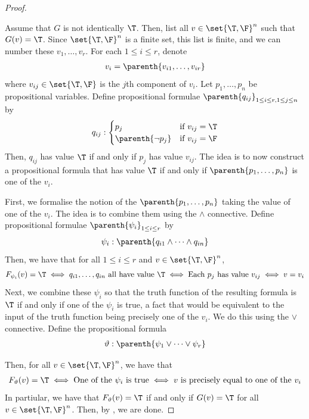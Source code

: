 \begin{proof}
\begin{description}
        Assume that $G$ is not identically $\T$. Then, list all $v \in \set{\T, \F}^n$ such that $G(v) = \T$. Since $\set{\T, \F}^n$ is a finite set, this list is finite, and we can number these $v_1, \ldots, v_r$. For each $1 \leq i \leq r$, denote
        \begin{align*}
            v_i = \parenth{v_{i1}, \ldots, v_{ir}}
        \end{align*}
        where $v_{ij} \in \set{\T, \F}$ is the $j$th component of $v_i$. Let $p_1, \ldots, p_n$ be propositional variables. Define propositional formulae $\parenth{q_{ij}}_{1 \leq i \leq r, 1 \leq j \leq n}$ by
        \begin{align*}
            q_{ij} : \begin{cases}
                p_j & \text{if } v_{ij} = \T \\
                \parenth{\neg p_j} & \text{if } v_{ij} = \F
            \end{cases}
        \end{align*}
        Then, $q_{ij}$ has value $\T$ if and only if $p_j$ has value $v_{ij}$. The idea is to now construct a propositional formula that has value $\T$ if and only if $\parenth{p_1, \ldots, p_n}$ is one of the $v_i$.
        
        First, we formalise the notion of the $\parenth{p_1, \ldots, p_n}$ taking the value of one of the $v_i$. The idea is to combine them using the $\land$ connective. Define propositional formulae $\parenth{\psi_i}_{1 \leq i \leq r}$ by
        \begin{align*}
            \psi_i : \parenth{q_{i1} \land \cdots \land q_{in}}
        \end{align*}
        Then, we have that for all $1 \leq i \leq r$ and $v \in \set{\T, \F}^n$,
        \begin{align*}
            F_{\psi_i}(v) = \T
            \iff
            q_{i1}, \ldots, q_{in} \text{ all have value } \T
            \iff
            \text{Each } p_j \text{ has value } v_{ij}
            \iff
            v = v_i
        \end{align*}
        Next, we combine these $\psi_i$ so that the truth function of the resulting formula is $\T$ if and only if one of the $\psi_i$ is true, a fact that would be equivalent to the input of the truth function  being precisely one of the $v_i$. We do this using the $\lor$ connective. Define the propositional formula
        \begin{align*}
            \vartheta : \parenth{\psi_1 \lor \cdots \lor \psi_r}
        \end{align*}
    \end{description}
    Then, for all $v \in \set{\T, \F}^n$, we have that
    \begin{align*}
        F_{\vartheta}(v) = \T
        \iff
       \text{One of the } \psi_i \text{ is true}
        \iff
        v \text{ is precisely equal to one of the } v_i
    \end{align*}
    In partiular, we have that $F_{\vartheta}(v) = \T$ if and only if $G(v) = \T$ for all $v \in \set{\T, \F}^n$. Then, by , we are done.
\end{proof}

